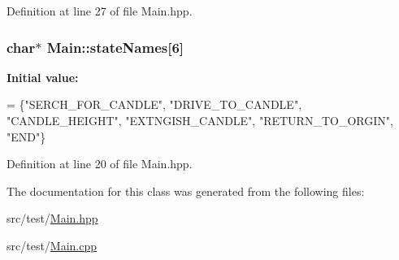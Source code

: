 Definition at line 27 of file Main.\-hpp.

\hypertarget{classMain_a2b7c0a58d48668f3b54b50c2800edb68}{
\subsubsection[{state\-Names}]{\setlength{\rightskip}{0pt plus 5cm}char$\ast$ Main\-::state\-Names\mbox{[}6\mbox{]}\hspace{0.3cm}{\ttfamily [private]}}}\label{classMain_a2b7c0a58d48668f3b54b50c2800edb68}
{\bfseries Initial value\-:}
\begin{DoxyCode}
= \{\textcolor{stringliteral}{"SERCH\_FOR\_CANDLE"},
      \textcolor{stringliteral}{"DRIVE\_TO\_CANDLE"},
      \textcolor{stringliteral}{"CANDLE\_HEIGHT"},
      \textcolor{stringliteral}{"EXTNGISH\_CANDLE"},
      \textcolor{stringliteral}{"RETURN\_TO\_ORGIN"},
      \textcolor{stringliteral}{"END"}\}
\end{DoxyCode}


Definition at line 20 of file Main.\-hpp.



The documentation for this class was generated from the following files\-:\begin{DoxyCompactItemize}
\item 
src/test/\hyperlink{Main_8hpp}{Main.\-hpp}\item 
src/test/\hyperlink{Main_8cpp}{Main.\-cpp}\end{DoxyCompactItemize}

